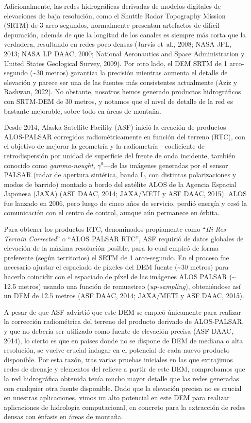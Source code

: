 \documentclass[spanish]{article}
\begin{document}
Adicionalmente, las redes hidrográficas derivadas de modelos digitales
de elevaciones de baja resolución, como el Shuttle Radar Topography
Mission (SRTM) de 3 arco-segundos, normalmente presentan artefactos de
difícil depuración, además de que la longitud de los canales es siempre
más corta que la verdadera, resultando en redes poco densas (Jarvis
et~al., 2008; NASA JPL, 2013; NASA LP DAAC, 2000; National Aeronautics
and Space Administration y United States Geological Survey, 2009). Por
otro lado, el DEM SRTM de 1 arco-segundo (\textasciitilde30 metros)
garantiza la precisión mientras aumenta el detalle de elevación y parece
ser una de las fuentes más consistentes actualmente (Aziz y Rashwan,
2022). No obstante, nosotros hemos generado productos hidrográficos con
SRTM-DEM de 30 metros, y notamos que el nivel de detalle de la red es
bastante mejorable, sobre todo en áreas de montaña.

Desde 2014, Alaska Satellite Facility (ASF) inició la creación de
productos ALOS-PALSAR corregidos radiométricamente en función del
terreno (RTC), con el objetivo de mejorar la geometría y la
radiometría---coeficiente de retrodispersión por unidad de superficie
del frente de onda incidente, también conocido como \emph{gamma-nought},
\(\gamma^0\)---de las imágenes generadas por el sensor PALSAR (radar de
apertura sintética, banda L, con distintas polarizaciones y modos de
barrido) montado a bordo del satélite ALOS de la Agencia Espacial
Japonesa (JAXA) (ASF DAAC, 2014; JAXA/METI y ASF DAAC, 2015). ALOS fue
lanzado en 2006, pero luego de cinco años de servicio, perdió energía y
cesó la comunicación con el centro de control, aunque aún permanece en
órbita.

Para obtener los productos RTC, denominados propiamente como
``\emph{Hi-Res Terrain Corrected}'' o ``ALOS PALSAR RTC'', ASF requirió
de datos globales de elevación de la máxima resolución posible, para lo
cual empleó de forma preferente (según territorios) el SRTM de 1
arco-segundo. En el proceso fue necesario ajustar el espaciado de
píxeles del DEM fuente (\textasciitilde30 metros) para hacerlo coincidir
con el espaciado de píxel de las imágenes ALOS PALSAR (\textasciitilde{}
12.5 metros) usando una función de remuestreo (\emph{up-sampling}),
obteniéndose así un DEM de 12.5 metros (ASF DAAC, 2014; JAXA/METI y ASF
DAAC, 2015).

A pesar de que ASF advirtió que este DEM se empleó únicamente para
realizar la corrección radiométrica del terreno del producto derivado de
ALOS-PALSAR, y que no debería ser utilizado como fuente de elevación
precisa (ASF DAAC, 2014), lo cierto es que en países donde no se dispone
de DEM de mediana o alta resolución, se vuelve crucial indagar en el
potencial de cada nuevo producto disponible. Por esta razón, tras varias
pruebas iniciales en las que extrajimos redes de drenaje y elementos del
relieve a partir de este DEM, comprobamos que la red hidrográfica
obtenida tenía mucho mayor detalle que las redes generadas con cualquier
otra fuente disponible. Dado que la elevación precisa no es crucial en
nuestras aplicaciones, vimos un alto potencial en este DEM para realizar
aplicaciones de hidrología computacional, en concreto para la extracción
de redes densas con énfasis en áreas de montaña.
\end{document}
